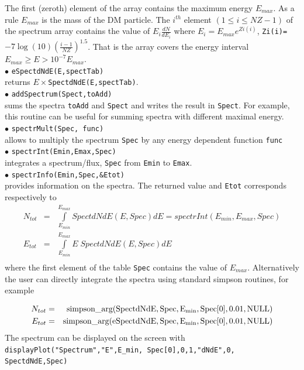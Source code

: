 \documentclass[12pt,a4paper]{article}
\begin{document}
The first (zeroth) element of the array contains the maximum energy $E_{max}$. As a rule   $E_{max}$ is the mass of the DM particle.    
The $i^{th}$ element $(1\le i \leq NZ-1)$ of the spectrum array contains
the value of $E_i \frac{ dN}{dE_i} $ where  $E_i=E_{max} e^{Zi(i)}$,   
\verb|Zi(i)=|$ -7 \log(10) \left(\frac{i-1}{NZ}\right)^{1.5}$.
 That is the array  covers the  energy interval  $E_{max} \ge E > 10^{-7}E_{max}$. \\
 
\noindent
$\bullet$ \verb|eSpectdNdE(E,spectTab)|\\
 returns $E\times$\verb|SpectdNdE(E,spectTab)|.\\

\noindent
$\bullet$ \verb|addSpectrum(Spect,toAdd)|\\
sums the  spectra \verb|toAdd|  and \verb|Spect| and writes the result in \verb|Spect|. For example, this routine can be useful for summing spectra 
with different  maximal energy.\\
\noindent
$\bullet$ \verb|spectrMult(Spec, func)|\\
allows to multiply the spectrum \verb|Spec| by any energy dependent function \verb|func|\\
\noindent
$\bullet$ \verb|spectrInt(Emin,Emax,Spec) | \\
integrates a spectrum/flux, \verb|Spec| from {\tt Emin} to  {\tt Emax}.\\
\noindent
$\bullet$ \verb|spectrInfo(Emin,Spec,&Etot)|\\
provides information on the spectra. The  returned value and \verb|Etot| corresponds respectively to   
\begin{eqnarray}
  N_{tot}&=&\int \limits_{E_{min}}^{E_{max}} SpectdNdE(E,Spec) dE = spectrInt(E_{min},E_{max},Spec) \\ 
  E_{tot}&=&  \int \limits_{E_{min}}^{E_{max}} E\; SpectdNdE(E,Spec)dE\\
  \nonumber
 \end{eqnarray}
where the first element of the table {\tt Spec} contains the value of   $E_{max}$.
Alternatively the user can directly integrate the spectra using standard simpson routines, for example

\begin{eqnarray}
  N_{tot}&=& {\rm simpson\_arg(SpectdNdE,Spec,E_{min},Spec[0],0.01,NULL)} \\ 
  E_{tot}&=&{\rm simpson\_arg(eSpectdNdE,Spec,E_{min},Spec[0],0.01,NULL)}
  \nonumber
 \end{eqnarray}
The spectrum can be displayed on the screen with \\
{\tt displayPlot("Spectrum","E",E\_min, Spec[0],0,1,"dNdE",0, SpectdNdE,Spec)}
\\
\end{document}
